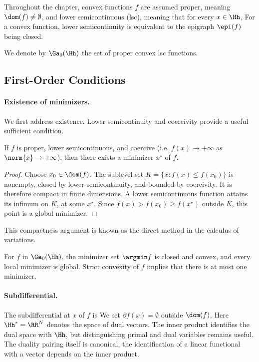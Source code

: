 Throughout the chapter, convex functions $f$ are assumed proper, meaning $\dom(f) \neq \emptyset$, and lower semicontinuous (lsc), meaning that for every $x \in \Hh$,
For a convex function, lower semicontinuity is equivalent to the epigraph $\epi(f)$ being closed.
 
We denote by $\Ga_0(\Hh)$ the set of proper convex lsc functions.

                                                                                  
\subsection{First-Order Conditions}

   
\paragraph{Existence of minimizers.}

We first address existence. Lower semicontinuity and coercivity provide a useful sufficient condition.

\begin{prop}
	If $f$ is proper, lower semicontinuous, and coercive (i.e. $f(x)\rightarrow +\infty$ as $\norm{x}\rightarrow +\infty$), then there exists a minimizer $x^\star$ of $f$.
\end{prop}

\begin{proof}
Choose $x_0\in\dom(f)$. The sublevel set $K=\{x:f(x)\leq f(x_0)\}$ is nonempty, closed by lower semicontinuity, and bounded by coercivity. It is therefore compact in finite dimensions. A lower semicontinuous function attains its infimum on $K$, at some $x^\star$. Since $f(x)>f(x_0)\geq f(x^\star)$ outside $K$, this point is a global minimizer.
\end{proof}

This compactness argument is known as the direct method in the calculus of variations.
 
For $f$ in $\Ga_0(\Hh)$, the minimizer set $\argmin f$ is closed and convex, and every local minimizer is global. Strict convexity of $f$ implies that there is at most one minimizer.

   
\paragraph{Subdifferential.}

The subdifferential at $x$ of $f$ is
We set $\partial f(x)=\emptyset$ outside $\dom(f)$. Here $\Hh^*=\RR^N$ denotes the space of dual vectors. The inner product identifies the dual space with $\Hh$, but distinguishing primal and dual variables remains useful. The duality pairing itself is canonical; the identification of a linear functional with a vector depends on the inner product.
 
